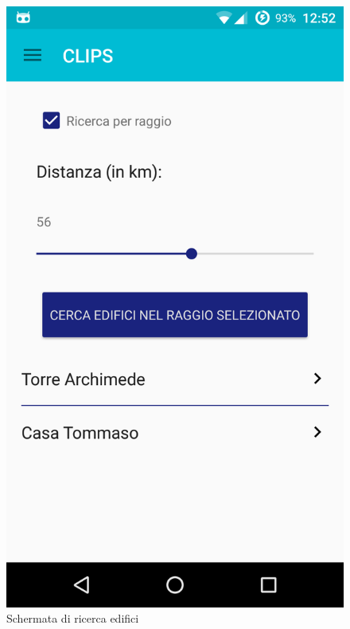 \begin{figure}[!h]
	\centering
	\includegraphics[scale=0.15]{screenshot/searchedifici}
	\caption{Schermata di ricerca edifici}
\end{figure}

